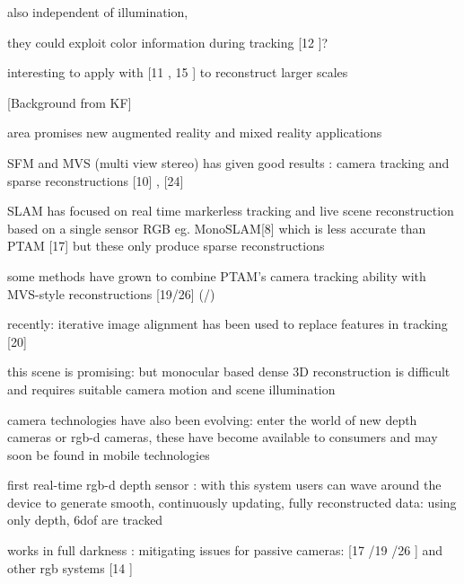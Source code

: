 also independent of illumination,

they could exploit color information during tracking [12 \cite{Kerl13Robust}]?

interesting to apply with [11 \cite{Kaess11Isam2}, 15 \cite{Kummerle11G}] to reconstruct larger scales






















[Background from KF]

area promises new augmented reality and mixed reality applications

SFM and MVS (multi view stereo) has given good results : camera tracking  and sparse reconstructions [10] \cite{Fitzgibbon98Automatic}, \cite{Seitz06Comparison} [24] 

SLAM has focused on real time markerless tracking and live scene reconstruction based on a single sensor RGB eg. MonoSLAM[8] \cite{Davison03Real} which is less accurate than PTAM [17] \cite{Klein07Parallel}  but these only produce sparse reconstructions

some methods have grown to combine PTAM's camera tracking ability with MVS-style reconstructions [19/26] (\cite{Newcombe10Live}/\cite{Stuhmer10Real})

recently: iterative image alignment has been used to replace features in tracking [20] \cite{Newcombe11Dtam}

this scene is promising: but monocular based dense 3D reconstruction is difficult and requires suitable camera motion and scene illumination

camera technologies have also been evolving: enter the world of new depth cameras or rgb-d cameras,
these have become available to consumers and may soon be found in mobile technologies \cite{Zhang12Microsoft}

first real-time rgb-d depth sensor : with this system users can wave around the device to generate smooth, continuously updating, fully reconstructed data: using only depth, 6dof are tracked

works in full darkness : mitigating issues for passive cameras: [17 \cite{Klein07Parallel} /19 \cite{Newcombe10Live} /26 \cite{Stuhmer10Real}] and other rgb systems [14 \cite{Henry10Rgb}]

